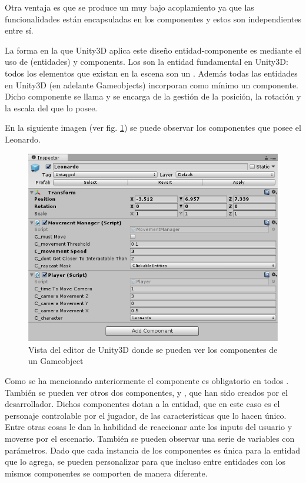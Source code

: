 Otra ventaja es que se produce un muy bajo acoplamiento ya que las funcionalidades están encapsuladas en los componentes y estos son independientes entre sí.

La forma en la que Unity3D aplica este diseño entidad-componente es mediante el uso de  (entidades) y components.
Los  son la entidad fundamental en Unity3D: todos los elementos que existan en la escena son un . Además todas las entidades en Unity3D (en adelante Gameobjects) incorporan como mínimo un componente. Dicho componente se llama  y se encarga de la gestión de la posición, la rotación y la escala del  que lo posee.

En la siguiente imagen (ver fig. \ref{gameobjectComponents}) se puede observar los componentes que posee el  Leonardo. 

\begin{figure}[H]
\begin{center}
\includegraphics[scale=1]{imagenes/GameobjectsAndComponents.png}
\caption{Vista del editor de Unity3D donde se pueden ver los componentes de un Gameobject}
\label{gameobjectComponents}
\end{center}
\end{figure}

Como se ha mencionado anteriormente el componente  es obligatorio en todos . También se pueden ver otros dos componentes,  y , que han sido creados por el desarrollador.
Dichos componentes dotan a la entidad, que en este caso es el personaje controlable por el jugador, de las características que lo hacen único. Entre otras cosas le dan la habilidad de reaccionar ante los inputs del usuario y moverse por el escenario. También se pueden observar una serie de variables con parámetros. Dado que cada instancia de los componentes es única para la entidad que lo agrega, se pueden personalizar para que incluso entre entidades con los mismos componentes se comporten de manera diferente.

